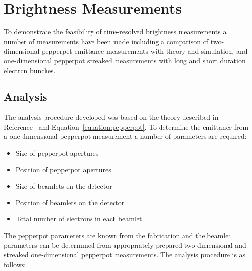 \section{Brightness Measurements}
To demonstrate the feasibility of time-resolved brightness measurements a number of measurements have been made including a comparison of two-dimensional pepperpot emittance measurements with theory and simulation, and one-dimensional pepperpot streaked measurements with long and short duration electron bunches.

\subsection{Analysis}
The analysis procedure developed was based on the theory described in Reference~\cite{zhang_emittance_1996} and Equation~\ref{equation:pepperpot}.
To determine the emittance from a one dimensional pepperpot measurement a number of parameters are required:
\begin{itemize}
    \item Size of pepperpot apertures
    \item Position of pepperpot apertures
    \item Size of beamlets on the detector
    \item Position of beamlets on the detector
    \item Total number of electrons in each beamlet
\end{itemize}
The pepperpot parameters are known from the fabrication and the beamlet parameters can be determined from appropriately prepared two-dimensional and streaked one-dimensional pepperpot measurements.
The analysis procedure is as follows:
